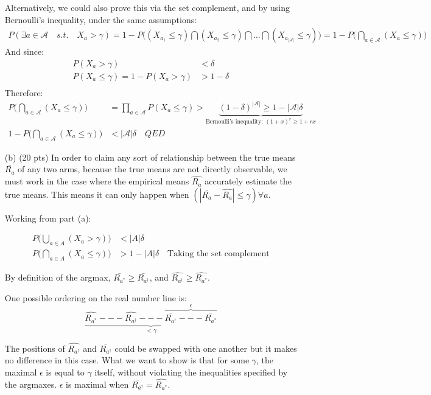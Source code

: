 \documentclass{article}
\begin{document}
\begin{enumerate}
Alternatively, we could also prove this via the set complement, and by using Bernoulli's inequality, under the same assumptions:
\begin{align*}
P(\exists a \in \mathcal A \quad s.t. \quad X_a > \gamma) = 1 - P\bigg((X_{a_1}\leq\gamma) \bigcap (X_{a_2}\leq\gamma) \bigcap ... \bigcap (X_{a_{|\mathcal A|}}\leq\gamma)\bigg)= 1 - P\bigg( \bigcap\limits_{a \in \mathcal A}^{}(X_a \leq \gamma) \bigg)
\end{align*}
And since:
\begin{align*}
P(X_a>\gamma) &< \delta \\
P(X_a\leq\gamma) = 1 - P(X_a > \gamma) &> 1-\delta \\
\end{align*}
Therefore:
\begin{align*}
P\bigg( \bigcap\limits_{a \in \mathcal A}^{}(X_a \leq \gamma) \bigg) &= \prod_{a \in \mathcal A}^{}P(X_a \leq \gamma) > \underbrace{(1-\delta)^{|\mathcal A|} \geq 1 - |\mathcal A|\delta}_{\text{Bernoulli's inequality: $(1+x)^r \geq 1+rx$}} \\
1 - P\bigg( \bigcap\limits_{a \in \mathcal A}^{}(X_a \leq \gamma) \bigg) &< |\mathcal A|\delta \quad QED
\end{align*}


\item[(b) (20 pts)] In order to claim any sort of relationship between the true means $\bar{R_a}$ of any two arms, because the true means are not directly observable, we must work in the case where the empirical means $\hat{R_a}$ accurately estimate the true means. This means it can only happen when $(|\bar{R_a} - \hat{R_a}| \leq \gamma) \forall a$.

Working from part (a):

\begin{align*}
P\bigg(\bigcup\limits_{a \in A}^{} (X_a > \gamma)\bigg) &< |A|\delta \\
P\bigg(\bigcap\limits_{a \in A}^{} (X_a \leq \gamma)\bigg) &> 1 - |A|\delta \quad \text{Taking the set complement}
\end{align*}

By definition of the argmax, $\bar{R_{a^*}} \geq \bar{R_{a^\dagger}}$, and $\hat{R_{a^\dagger}} \geq \hat{R_{a^*}}$.

One possible ordering on the real number line is:
$$\underbrace{\hat{R_{a^*}} --- \hat{R_{a^\dagger}} --- \overbrace{\bar{R_{a^\dagger}} --- \bar{R_{a^*}}}^{\epsilon}}_{<\gamma}$$

The positions of $\hat{R_{a^\dagger}}$ and $\bar{R_{a^\dagger}}$ could be swapped with one another but it makes no difference in this case. What we want to show is that for some $\gamma$, the maximal $\epsilon$ is equal to $\gamma$ itself, without violating the inequalities specified by the argmaxes. $\epsilon$ is maximal when $\bar{R_{a^\dagger}} = \hat{R_{a^*}}$.


\end{enumerate}
\end{document}
